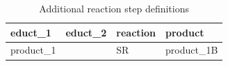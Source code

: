 \begin{table}[htbp]
\centering
\caption{Additional reaction step definitions}
\label{tab:table10}
\begin{tabular}{llll}
\toprule
educt\_1 & educt\_2 & reaction & product \\
\midrule
product\_1 &  & SR & product\_1B \\
\bottomrule
\end{tabular}
\end{table}